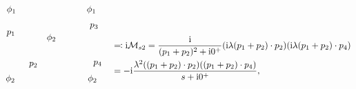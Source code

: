 \begin{equation}
\begin{gathered}
\begin{tikzpicture}[x=0.75pt,y=0.75pt,yscale=-0.75,xscale=0.75]
        \draw (149.71,95.6) node [anchor=south east] [inner sep=0.75pt]    {$\phi _{1}$};
        \draw (147.71,213.88) node [anchor=north east] [inner sep=0.75pt]    {$\phi _{2}$};
        \draw (148,125.86) node [anchor=north east] [inner sep=0.75pt]    {$p_{1}$};
        \draw (172.41,188.5) node [anchor=north west][inner sep=0.75pt]    {$p_{2}$};
        \draw (218.56,151.34) node [anchor=south] [inner sep=0.75pt]    {$\phi _{2}$};
        \draw (293.62,126.42) node [anchor=south west] [inner sep=0.75pt]    {$p_{3}$};
        \draw (300.71,193.1) node [anchor=west] [inner sep=0.75pt]    {$p_{4}$};
        \draw (287.41,95.6) node [anchor=south west] [inner sep=0.75pt]    {$\phi _{1}$};
        \draw (289.41,213.88) node [anchor=north west][inner sep=0.75pt]    {$\phi _{2}$};
        \end{tikzpicture}
    \end{gathered} \quad 
    \begin{aligned}[t]
         &\eqqcolon \ii \mathcal{M}_{s2} = \frac{\ii}{(p_1 + p_2)^2 + \ii 0^+} ( \ii \lambda (p_1 + p_2) \cdot p_2) ( \ii \lambda (p_1 + p_2) \cdot p_4) \\
         &= - \ii \frac{\lambda^2 ((p_1 + p_2) \cdot p_2)((p_1 + p_2) \cdot p_4)}{s + \ii 0^+ },
    \end{aligned}
\end{equation}